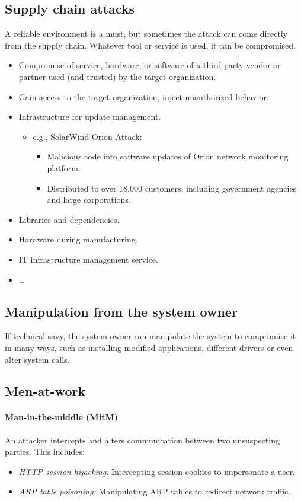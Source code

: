 \subsection{Supply chain attacks}
A reliable environment is a must, but sometimes the attack can come
directly from the supply chain. Whatever tool or service is used, it 
can be compromised. 
\begin{itemize}
  \item Compromise of service, hardware, or software of a third-party
    vendor or partner used (and trusted) by the target organization.
  \item Gain access to the target organization, inject unauthorized behavior.
  \item Infrastructure for update management.
    \begin{itemize}
      \item e.g., SolarWind Orion Attack:
        \begin{itemize}
          \item Malicious code into software updates of Orion network monitoring platform.
          \item Distributed to over 18,000 customers, including
            government agencies and large corporations.
        \end{itemize}
    \end{itemize}
  \item Libraries and dependencies.
  \item Hardware during manufacturing.
  \item IT infrastructure management service.
  \item \ldots
\end{itemize}
\subsection{Manipulation from the system owner}
If technical-savy, the system owner can manipulate the system to 
compromise it in many ways, such as installing modified applications,
different drivers or even alter system calls.
\subsection{Men-at-work}
\paragraph{Man-in-the-middle (MitM)}
An attacker intercepts and alters communication between two
unsuspecting parties. This includes:
\begin{itemize}
    \item \textit{HTTP session hijacking:} Intercepting session cookies to impersonate a user.
    \item \textit{ARP table poisoning:} Manipulating ARP tables to redirect network traffic.
\end{itemize}

